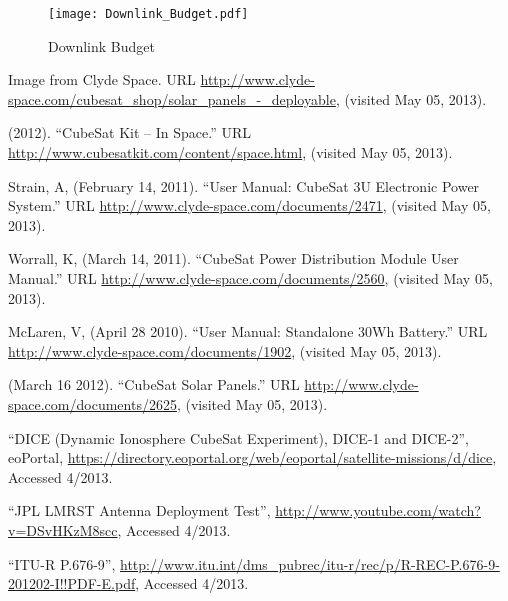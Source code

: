 \documentclass[12pt]{article}
\begin{document}
\begin{figure}[ht]
\centering 
\caption{Downlink Budget}
\texttt{[image: Downlink\_Budget.pdf]}
\end{figure}


\newpage

\begin{thebibliography}{9}








Image from Clyde Space.  URL \url{http://www.clyde-space.com/cubesat_shop/solar_panels_-_deployable}, (visited May 05, 2013).

 (2012).  ``CubeSat Kit -- In Space.''  URL \url{http://www.cubesatkit.com/content/space.html}, (visited May 05, 2013).

 Strain, A, (February 14, 2011).  ``User Manual: CubeSat 3U Electronic Power System.'' URL \url{http://www.clyde-space.com/documents/2471}, (visited May 05, 2013).

 Worrall, K, (March 14, 2011).  ``CubeSat Power Distribution Module User Manual.'' URL \url{http://www.clyde-space.com/documents/2560}, (visited May 05, 2013).

 McLaren, V, (April 28 2010).  ``User Manual: Standalone 30Wh Battery.''  URL \url{http://www.clyde-space.com/documents/1902}, (visited May 05, 2013).

 (March 16 2012). ``CubeSat Solar Panels.''  URL \url{http://www.clyde-space.com/documents/2625}, (visited May 05, 2013).


``DICE (Dynamic Ionosphere CubeSat Experiment), DICE-1 and DICE-2'', eoPortal, \url{https://directory.eoportal.org/web/eoportal/satellite-missions/d/dice}, Accessed 4/2013.

``JPL LMRST Antenna Deployment Test'', \url{http://www.youtube.com/watch?v=DSvHKzM8scc}, Accessed 4/2013.

``ITU-R P.676-9'', \url{http://www.itu.int/dms_pubrec/itu-r/rec/p/R-REC-P.676-9-201202-I!!PDF-E.pdf}, Accessed 4/2013.


\end{thebibliography}
\end{document}
